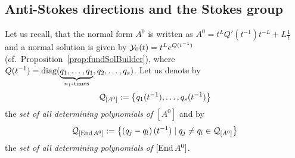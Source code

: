 \subsection{Anti-Stokes directions and the Stokes group}
Let us recall, that the normal form $A^0$ is written as
$A^0=t^LQ'(t^{-1})t^{-L}+L\frac{1}{t}$ and a normal solution is given by
$\mathcal{Y}_0(t)=t^Le^{Q(t^{-1})}$ (cf.\ Proposition~\ref{prop:fundSolBuilder}), where
$Q(t^{-1})=\diag(\underset{n_1\text{-times}}{\underbrace{%
  q_1,\dots,q_1}},q_2,\dots ,q_s)$.
Let us denote by
\[
  \mathcal{Q}_{[A^0]} := \left\{q_1(t^{-1}),\dots,q_s(t^{-1})\right\}
\]
the \emph{set of all determining polynomials of $[A^0]$} and by
\[
  \mathcal{Q}_{[\operatorname{End} A^0]}:=\left\{\left(q_j-q_l\right)(t^{-1})
    \mid q_j \neq q_l \in\mathcal{Q}_{[A^0]}
  \right\}
\]
the \emph{set of all determining polynomials of $[\operatorname{End} A^0]$}.

